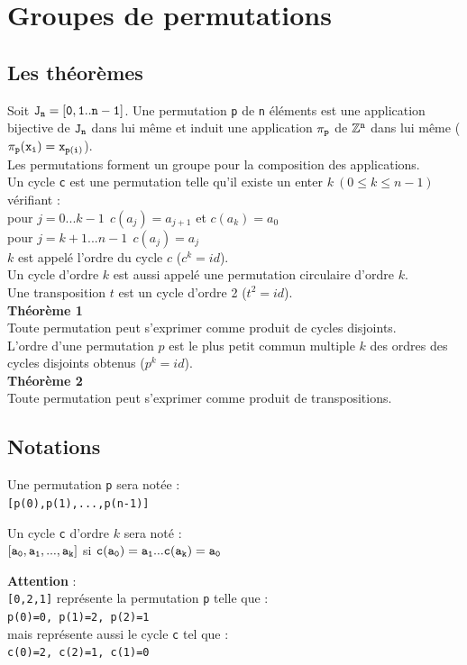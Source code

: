 \documentclass[a4paper,11pt]{book}
\begin{document}
\chapter{Groupes de permutations}
\section{Les th\'eor\`emes} \label{sec:theo}
Soit  ${\tt J_n=[0,1..n-1]}$.
Une permutation {\tt p} de {\tt n} \'el\'ements est une application bijective de 
${\tt J_n}$ dans lui m\^eme et induit une application ${\tt \pi_p}$ de  
${\tt \mathbb Z^n}$ dans lui m\^eme (${\tt \pi_p(x_i)=x_{p(i)}}$).\\
Les permutations forment un groupe pour la composition des applications.\\
Un cycle {\tt c} est une permutation telle qu'il existe un enter  
$k \ (0 \leq k \leq n-1)$ v\'erifiant :\\
pour $j=0...k-1 \ \ c(a_j)=a_{j+1}$ et $c(a_k)=a_0$\\
pour $j=k+1...n-1 \ \ c(a_j)=a_j$\\
$k$ est appel\'e l'ordre du cycle $c$ ($c^k=id$).\\
Un cycle d'ordre $k$ est aussi appel\'e une permutation circulaire d'ordre $k$.\\
Une transposition $t$ est un cycle d'ordre 2 ($t^2=id$).\\

{\bf Th\'eor\`eme 1}\\
Toute permutation peut s'exprimer comme produit de cycles disjoints.\\ 
L'ordre d'une permutation $p$ est le plus petit commun multiple $k$ des ordres 
des cycles disjoints obtenus ($p^k=id$).\\

{\bf Th\'eor\`eme 2}\\
Toute permutation peut s'exprimer comme produit de transpositions.\\
\section{Notations} \label{sec:notationperm}
Une permutation {\tt p} sera not\'ee :\\
{\tt [p(0),p(1),...,p(n-1)]}

Un cycle {\tt c} d'ordre $k$ sera not\'e :\\
${\tt [a_0,a_1,...,a_k]}$ si ${\tt c(a_0)=a_1...c(a_k)=a_0}$

{\bf Attention} :\\
{\tt [0,2,1]} repr\'esente la permutation {\tt p} telle que :\\
{\tt p(0)=0, p(1)=2, p(2)=1}\\
 mais repr\'esente aussi le cycle {\tt c} tel que :\\
{\tt c(0)=2, c(2)=1, c(1)=0}
\end{document}

